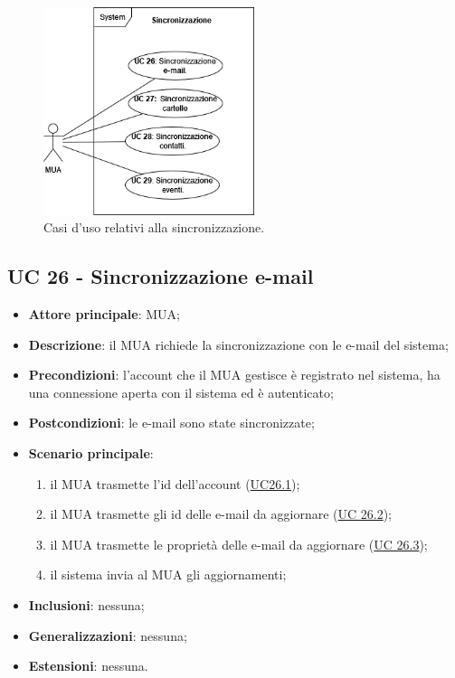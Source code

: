
\begin{figure}[H]
    \includegraphics[width=0.55\textwidth]{sections/uc_imgs/UC-sincronizzazione.png}
    \centering
    \caption{Casi d'uso relativi alla sincronizzazione.}
\end{figure}

\subsection{UC 26 - Sincronizzazione e-mail} \label{sec:UC26}
    
    \begin{itemize}
        \item \textbf{Attore principale}: MUA;
        \item \textbf{Descrizione}: il MUA richiede la sincronizzazione con le e-mail del sistema;
        \item \textbf{Precondizioni}: l’account che il MUA gestisce è registrato nel sistema, ha una connessione aperta con il sistema ed è autenticato;
        \item \textbf{Postcondizioni}: le e-mail sono state sincronizzate;
        \item \textbf{Scenario principale}:
            \begin{enumerate}
                \item il MUA trasmette l'id dell'account (\hyperref[sec:UC26.1]{UC26.1});
                \item il MUA trasmette gli id delle e-mail da aggiornare (\hyperref[sec:UC26.2]{UC 26.2});
                \item il MUA trasmette le proprietà delle e-mail da aggiornare (\hyperref[sec:UC26.3]{UC 26.3});
                \item il sistema invia al MUA gli aggiornamenti;
            \end{enumerate}
        \item \textbf{Inclusioni}: nessuna;
        \item \textbf{Generalizzazioni}: nessuna;
        \item \textbf{Estensioni}: nessuna.
    \end{itemize}

